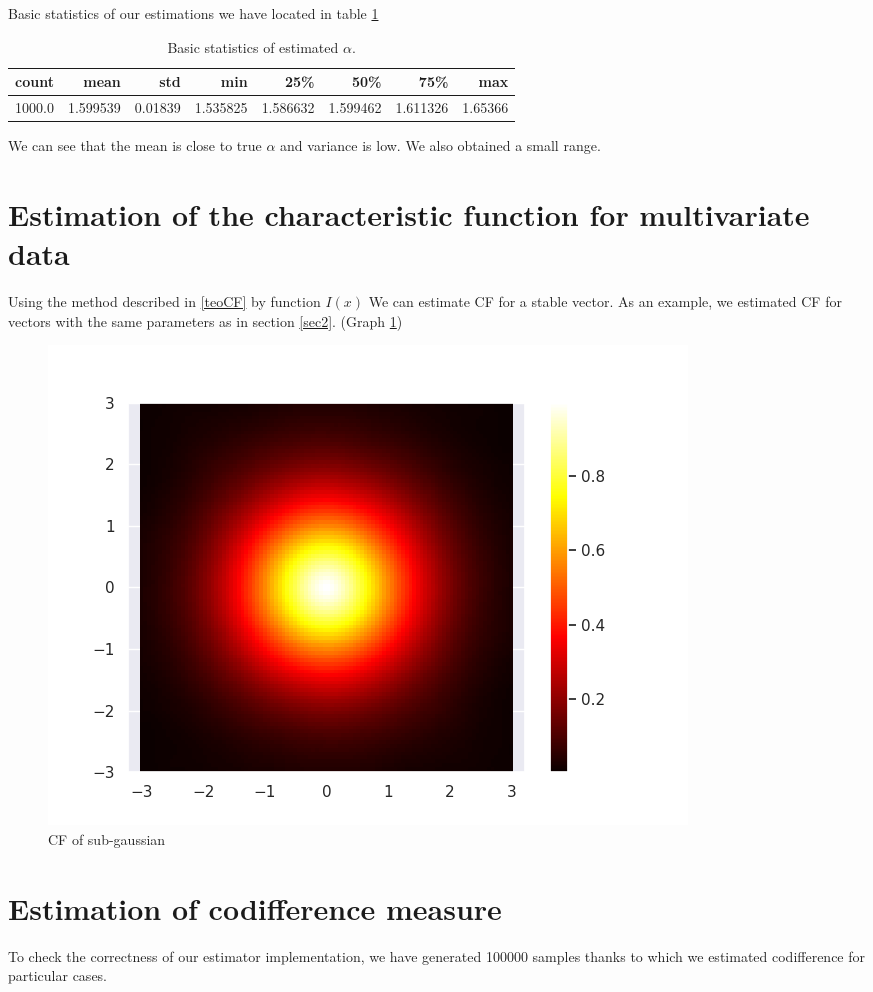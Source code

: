 \documentclass{article}
\begin{document}
	Basic statistics of our estimations we have located in table \ref{tab2}
	
	\begin{table}[H]
		\centering
		\begin{tabular}{rrrrrrrr}
			\hline
			count &      mean &      std &       min &       25\% &       50\% &       75\% &      max \\
			\hline
			1000.0 &  1.599539 &  0.01839 &  1.535825 &  1.586632 &  1.599462 &  1.611326 &  1.65366 \\
			\hline
		\end{tabular}
		\caption{Basic statistics of estimated $\alpha$.}\label{tab2}
	\end{table}
	
	We can see that the mean is close to true $\alpha$ and variance is low. We also obtained a small range.
	
	\section{Estimation of the characteristic function for multivariate data}
	Using the method described in \ref{teoCF} by function $I(x)$ We can estimate CF for a stable vector.
	As an example, we estimated CF for vectors with the same parameters as in section \ref{sec2}. (Graph \ref{12})
	\begin{figure}[H]
		\centering
		\includegraphics[width=1\linewidth]{images/ex_4_cf_sub_gaussian_SaS}
		\caption{CF of sub-gaussian}\label{12}
	\end{figure}
	
	\section{Estimation of codifference measure}
	To check the correctness of our estimator implementation, we have generated 100000 samples thanks to which we estimated codifference for particular cases.
	
\end{document}
